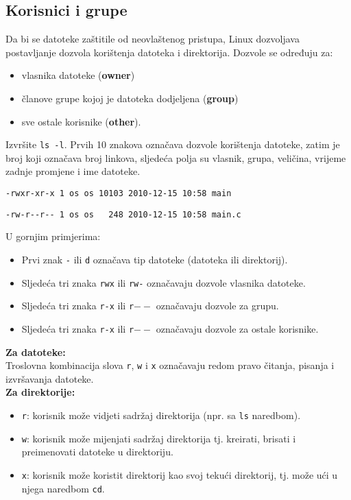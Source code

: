 \subsection*{Korisnici i grupe}
Da bi se datoteke zaštitile od neovlaštenog pristupa, Linux dozvoljava postavljanje dozvola korištenja datoteka i direktorija. Dozvole se određuju za:
\begin{itemize}
 \item vlasnika datoteke (\textbf{owner})
\item članove grupe kojoj je datoteka dodjeljena (\textbf{group})
\item sve ostale korisnike (\textbf{other}).
\end{itemize}
\begin{primjer} Izvršite \texttt{ls -l}. Prvih 10 znakova označava dozvole korištenja datoteke, zatim je broj koji označava broj linkova, sljedeća polja su vlasnik, grupa, veličina, 
vrijeme zadnje promjene i ime datoteke.

\lstinline!-rwxr-xr-x 1 os os 10103 2010-12-15 10:58 main !

\lstinline!-rw-r--r-- 1 os os   248 2010-12-15 10:58 main.c!
\end{primjer}
U gornjim primjerima:
\begin{itemize}
 \item Prvi znak \texttt{-} ili \texttt{d} označava tip datoteke (datoteka ili direktorij).
\item Sljedeća tri znaka \texttt{rwx} ili \texttt{rw-} označavaju dozvole vlasnika datoteke.
\item Sljedeća tri znaka \texttt{r-x} ili \texttt{r$--$} označavaju dozvole za grupu.
\item Sljedeća tri znaka \texttt{r-x} ili \texttt{r$--$} označavaju dozvole za ostale korisnike.
\end{itemize}
\textbf{Za datoteke:}\\
Troslovna kombinacija slova \texttt{r}, \texttt{w} i \texttt{x} označavaju redom pravo čitanja, pisanja i izvršavanja datoteke.\\
\textbf{Za direktorije:}
 \begin{itemize}
\item 
\texttt{r}: korisnik može vidjeti sadržaj direktorija (npr. sa \texttt{ls} naredbom).                                                                                                            
\item \texttt{w}: korisnik može mijenjati sadržaj direktorija tj. kreirati, brisati i preimenovati datoteke u direktoriju.
\item \texttt{x}: korisnik može koristit direktorij kao svoj tekući direktorij, tj. može ući u njega naredbom \texttt{cd}. 
\end{itemize}
